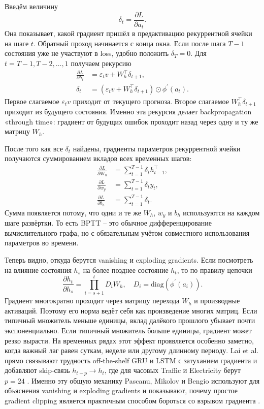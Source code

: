 \documentclass[12pt,fleqn]{article}
\begin{document}
Введём величину
\begin{equation}
  \delta_t
  =
  \frac{\partial L}{\partial a_t}.
\end{equation}
Она показывает, какой градиент пришёл в предактивацию рекуррентной ячейки на шаге $t$.
Обратный проход начинается с конца окна.
Если после шага $T-1$ состояния уже не участвуют в loss, удобно положить $\delta_T = 0$.
Для $t = T-1, T-2, \ldots, 1$ получаем рекурсию
\begin{align}
  \frac{\partial L}{\partial h_t}
  &=
  \varepsilon_t v + W_h^\top \delta_{t+1},
  \\
  \delta_t
  &=
  \left(
    \varepsilon_t v + W_h^\top \delta_{t+1}
  \right)
  \odot
  \phi^\prime(a_t).
\end{align}
Первое слагаемое $\varepsilon_t v$ приходит от текущего прогноза.
Второе слагаемое $W_h^\top \delta_{t+1}$ приходит из будущего состояния.
Именно эта рекурсия делает backpropagation «through time»: градиент от будущих ошибок проходит назад через одну и ту же матрицу $W_h$.

После того как все $\delta_t$ найдены, градиенты параметров рекуррентной ячейки получаются суммированием вкладов всех временных шагов:
\begin{align}
  \frac{\partial L}{\partial W_h}
  &=
  \sum_{t=1}^{T-1}
  \delta_t h_{t-1}^\top,
  \\
  \frac{\partial L}{\partial w_y}
  &=
  \sum_{t=1}^{T-1}
  \delta_t y_t,
  \\
  \frac{\partial L}{\partial b_h}
  &=
  \sum_{t=1}^{T-1}
  \delta_t.
\end{align}
Сумма появляется потому, что одни и те же $W_h$, $w_y$ и $b_h$ используются на каждом шаге развёртки.
То есть BPTT -- это обычное дифференцирование вычислительного графа, но с обязательным учётом совместного использования параметров во времени.

Теперь видно, откуда берутся vanishing и exploding gradients.
Если посмотреть на влияние состояния $h_s$ на более позднее состояние $h_t$, то по правилу цепочки
\begin{equation}
  \frac{\partial h_t}{\partial h_s}
  =
  \prod_{i=s+1}^{t}
  D_i W_h,
  \quad
  D_i = \mathrm{diag}\!\left(\phi^\prime(a_i)\right).
\end{equation}
Градиент многократно проходит через матрицу перехода $W_h$ и производные активаций.
Поэтому его норма ведёт себя как произведение многих матриц.
Если типичный множитель меньше единицы, вклад далёкого прошлого убывает почти экспоненциально.
Если типичный множитель больше единицы, градиент может резко вырасти.
На временных рядах этот эффект проявляется особенно заметно, когда важный лаг равен суткам, неделе или другому длинному периоду.
Lai et al. прямо связывают трудность off-the-shelf GRU и LSTM с затуханием градиента и добавляют skip-связь $h_{t-p} \to h_t$, где для часовых Traffic и Electricity берут $p=24$ \cite{lai2018}.
Именно эту общую механику Pascanu, Mikolov и Bengio используют для объяснения vanishing и exploding gradients и показывают, почему простое gradient clipping является практичным способом бороться со взрывом градиента \cite{pascanu2013}.
\end{document}
